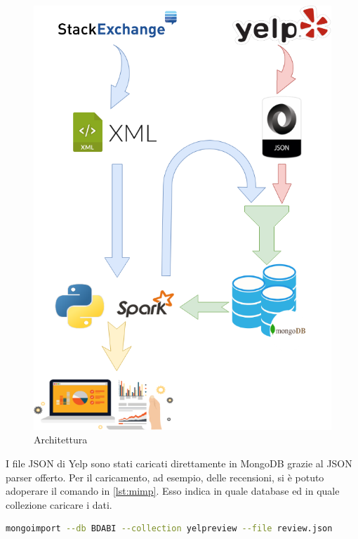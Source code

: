 \begin{figure}[H]
	\centering
	\includegraphics[scale=0.5]{./image/BDABI.png}
	\caption{Architettura}
	\label{fig:arc}
\end{figure}
I file JSON di Yelp sono stati caricati direttamente in MongoDB grazie al JSON parser offerto.
Per il caricamento, ad esempio, delle recensioni, si è potuto adoperare il comando in \ref{lst:mimp}. Esso indica in quale database ed in quale collezione caricare i dati.\par

\begin{lstlisting}[language=Bash, caption={Yelp Dataset Loading}, captionpos=b, label={lst:mimp}]
mongoimport --db BDABI --collection yelpreview --file review.json
\end{lstlisting}
 
